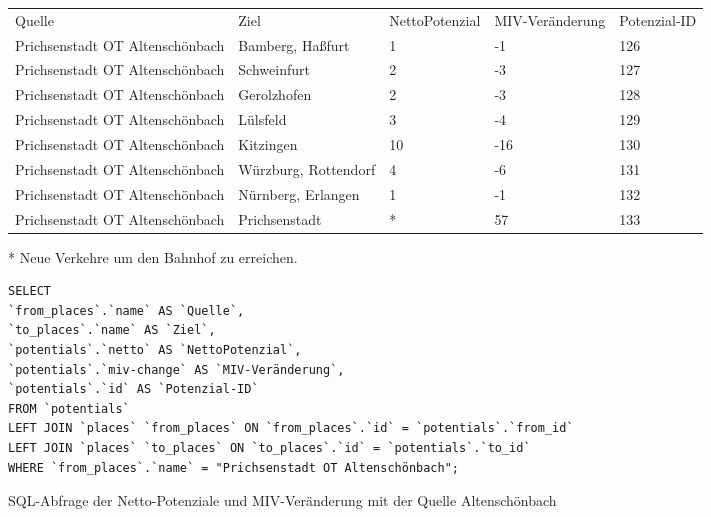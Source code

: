 \begin{tabularx}{\textwidth}{*5{X}}
Quelle & Ziel & NettoPotenzial & MIV-Veränderung & Potenzial-ID\\ 
Prichsenstadt OT Altenschönbach & Bamberg, Haßfurt & 1 & -1 & 126\\ 
Prichsenstadt OT Altenschönbach & Schweinfurt & 2 & -3 & 127\\ 
Prichsenstadt OT Altenschönbach & Gerolzhofen & 2 & -3 & 128\\ 
Prichsenstadt OT Altenschönbach & Lülsfeld & 3 & -4 & 129\\ 
Prichsenstadt OT Altenschönbach & Kitzingen & 10 & -16 & 130\\ 
Prichsenstadt OT Altenschönbach & Würzburg, Rottendorf & 4 & -6 & 131\\ 
Prichsenstadt OT Altenschönbach & Nürnberg, Erlangen & 1 & -1 & 132\\ 
Prichsenstadt OT Altenschönbach & Prichsenstadt & * & 57 & 133\\ 
\end{tabularx}    
\newline
\newline
* Neue Verkehre um den Bahnhof zu erreichen.
\newline
\begin{listing}[htbp]
\begin{verbatim}
SELECT
`from_places`.`name` AS `Quelle`, 
`to_places`.`name` AS `Ziel`, 
`potentials`.`netto` AS `NettoPotenzial`, 
`potentials`.`miv-change` AS `MIV-Veränderung`, 
`potentials`.`id` AS `Potenzial-ID` 
FROM `potentials`
LEFT JOIN `places` `from_places` ON `from_places`.`id` = `potentials`.`from_id`
LEFT JOIN `places` `to_places` ON `to_places`.`id` = `potentials`.`to_id`
WHERE `from_places`.`name` = "Prichsenstadt OT Altenschönbach";
\end{verbatim}
\caption{SQL-Abfrage der Netto-Potenziale und MIV-Veränderung mit der Quelle Altenschönbach}\label{lst-fz-altenschoenbach}
\end{listing}